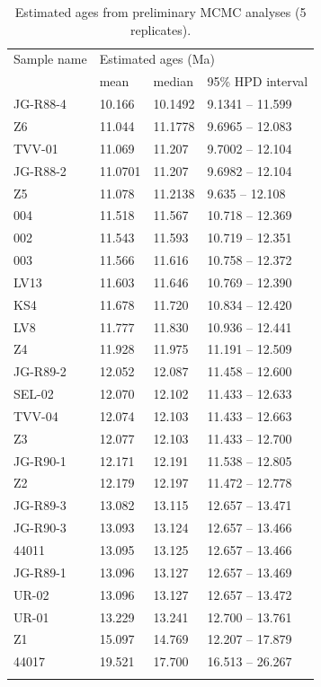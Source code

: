 \documentclass[12pt,letterpaper]{article}
\begin{document}
\begin{longtable}{llll}
\caption{Estimated ages from preliminary MCMC analyses (5 replicates). }\\
\hline
Sample name  &  \multicolumn{3}{l}{Estimated ages (Ma)} \\ 
   &  mean  &  median  &  95\% HPD interval \\ 
\hline
JG-R88-4  &  10.166  &  10.1492  &  9.1341 -- 11.599 \\ 
Z6  &  11.044  &  11.1778  &  9.6965 -- 12.083 \\ 
TVV-01  &  11.069  &  11.207  &  9.7002 -- 12.104 \\ 
JG-R88-2  &  11.0701  &  11.207  &  9.6982 -- 12.104 \\ 
Z5  &  11.078  &  11.2138  &  9.635 -- 12.108 \\ 
004  &  11.518  &  11.567  &  10.718 -- 12.369 \\ 
002  &  11.543  &  11.593  &  10.719 -- 12.351 \\ 
003  &  11.566  &  11.616  &  10.758 -- 12.372 \\ 
LV13  &  11.603  &  11.646  &  10.769 -- 12.390 \\ 
KS4  &  11.678  &  11.720  &  10.834 -- 12.420 \\ 
LV8  &  11.777  &  11.830  &  10.936 -- 12.441 \\ 
Z4  &  11.928  &  11.975  &  11.191 -- 12.509 \\ 
JG-R89-2  &  12.052  &  12.087  &  11.458 -- 12.600 \\ 
SEL-02  &  12.070  &  12.102  &  11.433 -- 12.633 \\ 
TVV-04  &  12.074  &  12.103  &  11.433 -- 12.663 \\ 
Z3  &  12.077  &  12.103  &  11.433 -- 12.700 \\ 
JG-R90-1  &  12.171  &  12.191  &  11.538 -- 12.805 \\ 
Z2  &  12.179  &  12.197  &  11.472 -- 12.778 \\ 
JG-R89-3  &  13.082  &  13.115  &  12.657 -- 13.471 \\ 
JG-R90-3  &  13.093  &  13.124  &  12.657 -- 13.466 \\ 
44011  &  13.095  &  13.125  &  12.657 -- 13.466 \\ 
JG-R89-1  &  13.096  &  13.127  &  12.657 -- 13.469 \\ 
UR-02  &  13.096  &  13.127  &  12.657 -- 13.472 \\ 
UR-01  &  13.229  &  13.241  &  12.700 -- 13.761 \\ 
Z1  &  15.097  &  14.769  &  12.207 -- 17.879 \\ 
44017  &  19.521  &  17.700  &  16.513 -- 26.267 \\
\hline
\label{table_res}	
\end{longtable}
\renewcommand\baselinestretch{1.66}\selectfont
\end{document}

